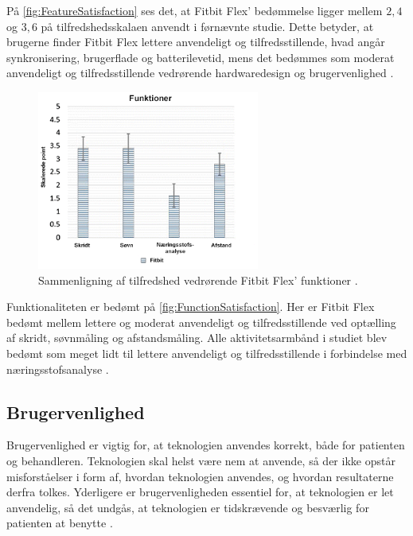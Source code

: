 \noindent
På \autoref{fig:FeatureSatisfaction} ses det, at Fitbit Flex' bedømmelse ligger mellem $2,4$ og $3,6$ på tilfredshedsskalaen anvendt i førnævnte studie. Dette betyder, at brugerne finder Fitbit Flex lettere anvendeligt og tilfredsstillende, hvad angår synkronisering, brugerflade og batterilevetid, mens det bedømmes som moderat anvendeligt og tilfredsstillende vedrørende hardwaredesign og brugervenlighed \citep{kaewkannate2016}.

\begin{figure}[H]
	\centering
	\includegraphics[width=0.65\textwidth]{figures/FunctionSatisfaction2}
	\caption{Sammenligning af tilfredshed vedrørende Fitbit Flex' funktioner \citep{kaewkannate2016}.}
	\label{fig:FunctionSatisfaction}
\end{figure}

\noindent
Funktionaliteten er bedømt på \autoref{fig:FunctionSatisfaction}. Her er Fitbit Flex bedømt mellem lettere og moderat anvendeligt og tilfredsstillende ved optælling af skridt, søvnmåling og afstandsmåling. Alle aktivitetsarmbånd i studiet blev bedømt som meget lidt til lettere anvendeligt og tilfredsstillende i forbindelse med næringsstofsanalyse \citep{kaewkannate2016}.

\subsection{Brugervenlighed}

Brugervenlighed er vigtig for, at teknologien anvendes korrekt, både for patienten og behandleren. Teknologien skal helst være nem at anvende, så der ikke opstår misforståelser i form af, hvordan teknologien anvendes, og hvordan resultaterne derfra tolkes. Yderligere er brugervenligheden essentiel for, at teknologien er let anvendelig, så det undgås, at teknologien er tidskrævende og besværlig for patienten at benytte \citep{Nordgren2013}. 

